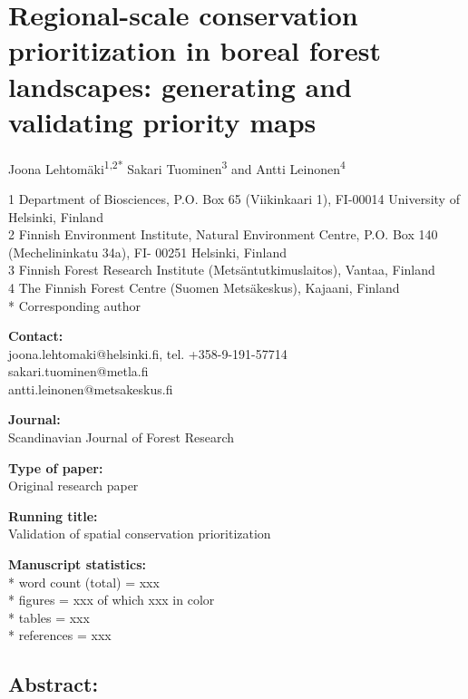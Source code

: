 \documentclass[]{article}
\begin{document}
\section{Regional-scale conservation prioritization in boreal forest
landscapes: generating and validating priority maps}

Joona Lehtomäki\textsuperscript{1,2*} Sakari Tuominen\textsuperscript{3}
and Antti Leinonen\textsuperscript{4}

1 Department of Biosciences, P.O. Box 65 (Viikinkaari 1), FI-00014
University of Helsinki, Finland\\2 Finnish Environment Institute,
Natural Environment Centre, P.O. Box 140 (Mechelininkatu 34a), FI- 00251
Helsinki, Finland\\3 Finnish Forest Research Institute
(Metsäntutkimuslaitos), Vantaa, Finland\\4 The Finnish Forest Centre
(Suomen Metsäkeskus), Kajaani, Finland\\* Corresponding author

\textbf{Contact:}\\joona.lehtomaki@helsinki.fi, tel.
+358-9-191-57714\\sakari.tuominen@metla.fi\\antti.leinonen@metsakeskus.fi

\textbf{Journal:}\\Scandinavian Journal of Forest Research

\textbf{Type of paper:}\\Original research paper

\textbf{Running title:}\\Validation of spatial conservation
prioritization

\textbf{Manuscript statistics:}\\* word count (total) = xxx\\* figures =
xxx of which xxx in color\\* tables = xxx\\* references = xxx

\subsection{Abstract:}
\end{document}
